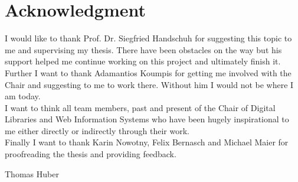 \section*{Acknowledgment}
I would like to thank Prof. Dr. Siegfried Handschuh for suggesting this topic to me and supervising my thesis. There have been obstacles on the way but his support helped me continue working on this project and ultimately finish it.\\
Further I want to thank Adamantios Koumpis for getting me involved with the Chair and suggesting to me to work there. Without him I would not be where I am today.\\
I want to think all team members, past and present of the Chair of Digital Libraries and Web Information Systems who have been hugely inspirational to me either directly or indirectly through their work.\\
Finally I want to thank Karin Nowotny, Felix Bernasch and Michael Maier for proofreading the thesis and providing feedback.\\
\begin{flushright}
Thomas Huber\\[1pc]
\end{flushright}